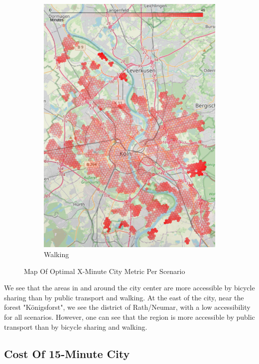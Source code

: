 \begin{figure}
\begin{subfigure}[b]{0.3\textwidth}
         \includegraphics[width=\textwidth]{Figures/results/minute_city_metric/walking_optimal_map}
         \caption{Walking}
         \label{fig:walking_optimal_map}
     \end{subfigure}
        \caption{Map Of Optimal X-Minute City Metric Per Scenario}
        \label{fig:optimal_map_per_scenario}
\end{figure}

We see that the areas in and around the city center are more accessible by bicycle sharing than by public transport and walking.
At the east of the city, near the forest "Königsforst", we see the district of Rath/Neumar, with a low accessibility for all scenarios.
However, one can see that the region is more accessible by public transport than by bicycle sharing and walking.

\subsection{Cost Of 15-Minute City}
\label{subsec:cost_of_15_minute_city}

